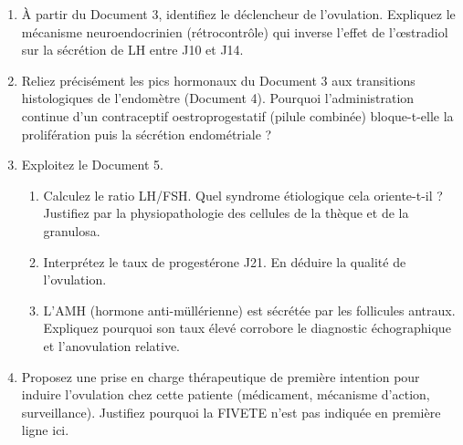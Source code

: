 \documentclass[11pt]{article}
\begin{document}
\begin{exercice}
\begin{enumerate}
\item À partir du Document 3, identifiez le déclencheur de l'ovulation. Expliquez le mécanisme neuroendocrinien (rétrocontrôle) qui inverse l'effet de l'œstradiol sur la sécrétion de LH entre J10 et J14.
\item Reliez précisément les pics hormonaux du Document 3 aux transitions histologiques de l'endomètre (Document 4). Pourquoi l'administration continue d'un contraceptif oestroprogestatif (pilule combinée) bloque-t-elle la prolifération puis la sécrétion endométriale ?
\item Exploitez le Document 5.
      \begin{enumerate}
      \item Calculez le ratio LH/FSH. Quel syndrome étiologique cela oriente-t-il ? Justifiez par la physiopathologie des cellules de la thèque et de la granulosa.
      \item Interprétez le taux de progestérone J21. En déduire la qualité de l'ovulation.
      \item L'AMH (hormone anti-müllérienne) est sécrétée par les follicules antraux. Expliquez pourquoi son taux élevé corrobore le diagnostic échographique et l'anovulation relative.
      \end{enumerate}
\item Proposez une prise en charge thérapeutique de première intention pour induire l'ovulation chez cette patiente (médicament, mécanisme d'action, surveillance). Justifiez pourquoi la FIVETE n'est pas indiquée en première ligne ici.
\end{enumerate}
\end{exercice}
\end{document}
